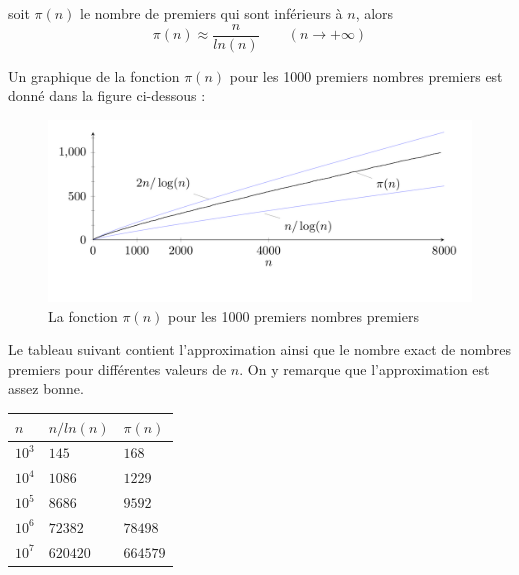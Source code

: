 		\vspace{-1.5em}\begin{adjustwidth}{1.5cm}{1.5cm} 
		\begin{Th}
			soit $\pi(n)$ le nombre de premiers qui sont inférieurs à $n$, alors
			\[\pi(n) \approx \frac{n}{ln(n)} \quad \quad (n \to +\infty)\]
		\end{Th}
		\end{adjustwidth}\vspace{0.5em}
		
	Un graphique de la fonction $\pi(n)$ pour les 1000 premiers nombres premiers est donné dans la figure ci-dessous :
	\begin{figure}[H]
		\begin{center}\includegraphics[scale=0.4]{img/freqPremiers.png}\end{center}\vspace{-3em}
		\caption{La fonction $\pi(n)$ pour les 1000 premiers nombres premiers}\label{fig:M3}
	\end{figure}
	
	Le tableau suivant contient l'approximation ainsi que le nombre exact de nombres premiers pour différentes valeurs de $n$. On y remarque que l'approximation est assez bonne.
	\begin{table}[H]\begin{center}
		\begin{tabular}{|lll|}
		\hline
		$n$  & $n/ln(n)$ & $\pi(n)$     \\ \hline
		$10^{3}$ & $145$     & $168$     \\
		$10^{4}$ & $1 086$   & $1 229$   \\
		$10^{5}$ & $8 686$   & $9 592$   \\
		$10^{6}$ & $72 382$  & $78 498$  \\
		$10^{7}$ & $620 420$ & $664 579$ \\ \hline
		\end{tabular}
	\end{center}\end{table}
	
